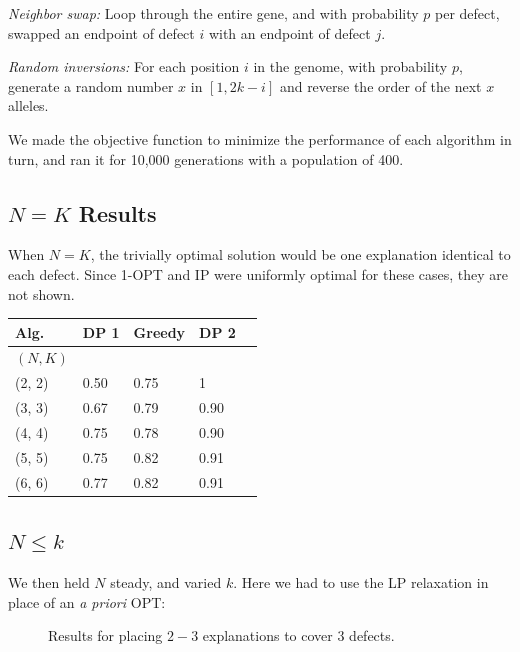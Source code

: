 {\it Neighbor swap:} Loop through the entire gene, and with probability $p$ per defect, swapped an endpoint of defect $i$ with an endpoint of defect $j$.

{\it Random inversions:} For each position $i$ in the genome, with probability $p$, generate a random number $x$ in $[1,2k-i]$ and reverse the order of the next $x$ alleles.  

We made the objective function to minimize the performance of each algorithm in turn, and ran it for 10,000 generations with a population of 400.  

\subsection{$N=K$ Results}

When $N=K$, the trivially optimal solution would be one explanation identical to each defect.  Since 1-OPT and IP were uniformly optimal for these cases, they are not shown.

\vspace{6pt}

\begin{tabular}{l|llll}
{\bf Alg.} & DP 1 & Greedy & DP 2 \\ \hline
{\bf $(N,K)$ } \\
(2, 2) & 0.50 & 0.75  & 1    \\
(3, 3) & 0.67 & 0.79  & 0.90 \\
(4, 4) & 0.75 & 0.78  & 0.90 \\
(5, 5) & 0.75 & 0.82  & 0.91 \\
(6, 6) & 0.77 & 0.82  & 0.91 \\
\end{tabular}

\subsection{$N \leq k$}

We then held $N$ steady, and varied $k$. Here we had to use the LP relaxation in place of an {\it a priori } OPT:

\begin{figure}[ht!] \centering
  \caption{Results for placing $2-3$ explanations to cover $3$ defects.}
\end{figure}
\FloatBarrier

